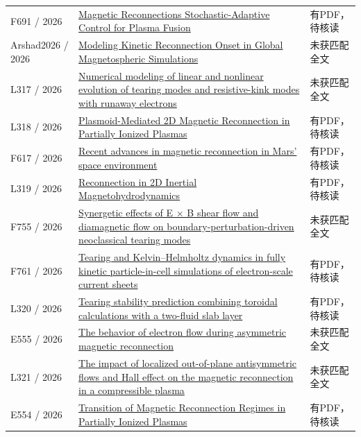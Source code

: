 \begin{longtable}{P{24mm}P{97mm}P{27mm}}
F691 / 2026 & \href{https://doi.org/10.21203/rs.3.rs-8443380/v1}{Magnetic Reconnections Stochastic-Adaptive Control for Plasma Fusion} & 有PDF，待核读\\

Arshad2026 / 2026 & \href{https://doi.org/10.1029/2026ja035547}{Modeling Kinetic Reconnection Onset in Global Magnetospheric Simulations} & 未获匹配全文\\

L317 / 2026 & \href{https://doi.org/10.1088/1741-4326/ae4e49}{Numerical modeling of linear and nonlinear evolution of tearing modes and resistive-kink modes with runaway electrons} & 未获匹配全文\\

L318 / 2026 & \href{https://doi.org/10.13140/rg.2.2.22493.17125}{Plasmoid-Mediated 2D Magnetic Reconnection in Partially Ionized Plasmas} & 有PDF，待核读\\

F617 / 2026 & \href{https://doi.org/10.1007/s11038-026-09597-z}{Recent advances in magnetic reconnection in Mars’ space environment} & 有PDF，待核读\\

L319 / 2026 & \href{https://doi.org/10.48550/arxiv.2610.23494}{Reconnection in 2D Inertial Magnetohydrodynamics} & 有PDF，待核读\\

F755 / 2026 & \href{https://doi.org/10.1088/1741-4326/ae3332}{Synergetic effects of E × B shear flow and diamagnetic flow on boundary-perturbation-driven neoclassical tearing modes} & 未获匹配全文\\

F761 / 2026 & \href{https://doi.org/10.1063/5.0336253}{Tearing and Kelvin–Helmholtz dynamics in fully kinetic particle-in-cell simulations of electron-scale current sheets} & 有PDF，待核读\\

L320 / 2026 & \href{https://doi.org/10.1088/1361-6587/ae7156}{Tearing stability prediction combining toroidal calculations with a two-fluid slab layer} & 有PDF，待核读\\

E555 / 2026 & \href{https://doi.org/10.1088/1402-4896/ae52bc}{The behavior of electron flow during asymmetric magnetic reconnection} & 未获匹配全文\\

L321 / 2026 & \href{https://doi.org/10.1140/epjd/s10053-025-01116-5}{The impact of localized out-of-plane antisymmetric flows and Hall effect on the magnetic reconnection in a compressible plasma} & 未获匹配全文\\

E554 / 2026 & \href{https://doi.org/10.3847/1538-4357/ae91d4}{Transition of Magnetic Reconnection Regimes in Partially Ionized Plasmas} & 有PDF，待核读\\

\bottomrule\end{longtable}\normalsize